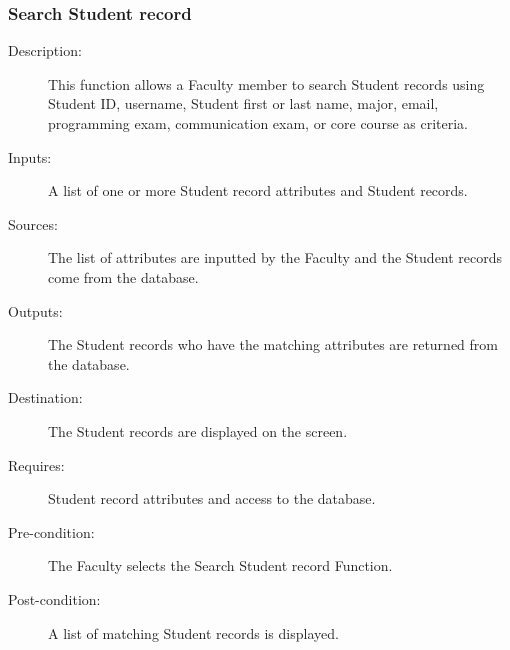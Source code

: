 \subsubsection{\large Search Student record} 
\begin{boxed} %
\begin{description}
\item[Description:]
   This function allows a Faculty member to search Student records using
   Student ID, username, Student first or last name, major, email, programming
   exam, communication exam, or core course as criteria.
\item[Inputs:]
   A list of one or more Student record attributes and Student records.
\item[Sources:]
   The list of attributes are inputted by the Faculty and the Student records
   come from the database.
\item[Outputs:]
   The Student records who have the matching attributes are returned from the
   database.
\item[Destination:]
   The Student records are displayed on the screen.
\item[Requires:]
   Student record attributes and access to the database.
\item[Pre-condition:]
   The Faculty selects the Search Student record Function.
\item[Post-condition:]
   A list of matching Student records is displayed.
\end{description}
\end{boxed} %

